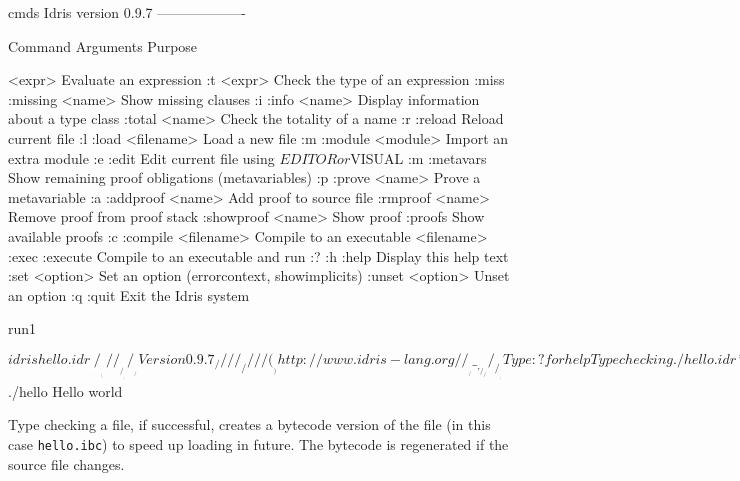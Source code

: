\begin{SaveVerbatim}{cmds}
Idris version 0.9.7
-------------------

   Command         Arguments   Purpose
                               
   <expr>                      Evaluate an expression
   :t              <expr>      Check the type of an expression
   :miss :missing  <name>      Show missing clauses
   :i :info        <name>      Display information about a type class
   :total          <name>      Check the totality of a name
   :r :reload                  Reload current file
   :l :load        <filename>  Load a new file
   :m :module      <module>    Import an extra module
   :e :edit                    Edit current file using $EDITOR or $VISUAL
   :m :metavars                Show remaining proof obligations (metavariables)
   :p :prove       <name>      Prove a metavariable
   :a :addproof    <name>      Add proof to source file
   :rmproof        <name>      Remove proof from proof stack
   :showproof      <name>      Show proof
   :proofs                     Show available proofs
   :c :compile     <filename>  Compile to an executable <filename>
   :exec :execute              Compile to an executable and run
   :? :h :help                 Display this help text
   :set            <option>    Set an option (errorcontext, showimplicits)
   :unset          <option>    Unset an option
   :q :quit                    Exit the Idris system
\end{SaveVerbatim}


\begin{SaveVerbatim}{run1}

$ idris hello.idr
     ____    __     _                                          
    /  _/___/ /____(_)____                                     
    / // __  / ___/ / ___/     Version 0.9.7
  _/ // /_/ / /  / (__  )      http://www.idris-lang.org/      
 /___/\__,_/_/  /_/____/       Type :? for help        

Type checking ./hello.idr
*hello> :t main 
main : IO ()
*hello> :c hello 
*hello> :q 
Bye bye
$ ./hello 
Hello world

\end{SaveVerbatim}


\noindent
Type checking a file, if successful, creates a bytecode version of the file (in
this case \texttt{hello.ibc}) to speed up loading in future. The bytecode is
regenerated if the source file changes.

